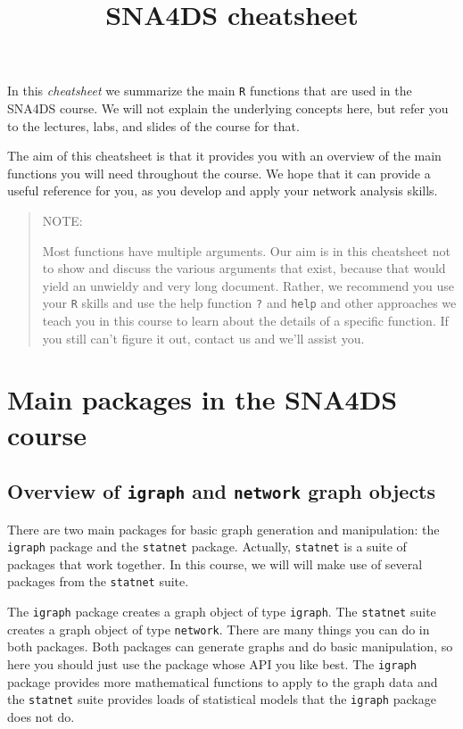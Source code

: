 \documentclass[
]{article}
\title{SNA4DS cheatsheet}
\author{}
\date{\vspace{-2.5em}}
\begin{document}
\maketitle

{
\setcounter{tocdepth}{2}
\tableofcontents
}
In this \emph{cheatsheet} we summarize the main \texttt{R} functions
that are used in the SNA4DS course. We will not explain the underlying
concepts here, but refer you to the lectures, labs, and slides of the
course for that.

The aim of this cheatsheet is that it provides you with an overview of
the main functions you will need throughout the course. We hope that it
can provide a useful reference for you, as you develop and apply your
network analysis skills.

\begin{quote}
NOTE:

Most functions have multiple arguments. Our aim is in this cheatsheet
not to show and discuss the various arguments that exist, because that
would yield an unwieldy and very long document. Rather, we recommend you
use your \texttt{R} skills and use the help function \texttt{?} and
\texttt{help} and other approaches we teach you in this course to learn
about the details of a specific function. If you still can't figure it
out, contact us and we'll assist you.
\end{quote}

\hypertarget{main_packages}{%
\section{Main packages in the SNA4DS course}\label{main_packages}}

\hypertarget{overview-of-igraph-and-network-graph-objects}{%
\subsection{\texorpdfstring{Overview of \texttt{igraph} and
\texttt{network} graph
objects}{Overview of igraph and network graph objects}}\label{overview-of-igraph-and-network-graph-objects}}

There are two main packages for basic graph generation and manipulation:
the \texttt{igraph} package and the \texttt{statnet} package. Actually,
\texttt{statnet} is a suite of packages that work together. In this
course, we will will make use of several packages from the
\texttt{statnet} suite.

The \texttt{igraph} package creates a graph object of type
\texttt{igraph}. The \texttt{statnet} suite creates a graph object of
type \texttt{network}. There are many things you can do in both
packages. Both packages can generate graphs and do basic manipulation,
so here you should just use the package whose API you like best. The
\texttt{igraph} package provides more mathematical functions to apply to
the graph data and the \texttt{statnet} suite provides loads of
statistical models that the \texttt{igraph} package does not do.
\end{document}
